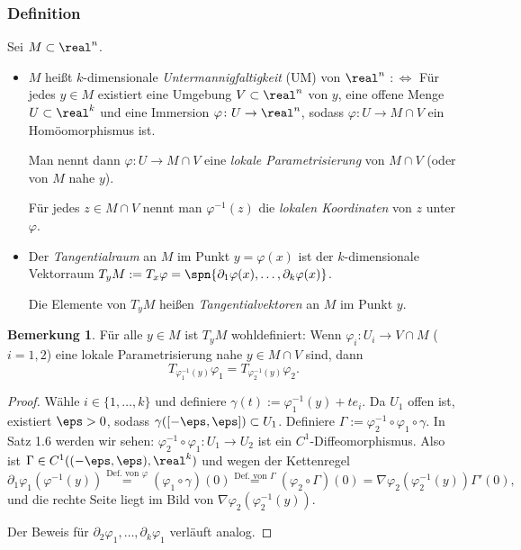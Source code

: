 \documentclass[
 a4paper,
 12pt,
 parskip=half
 ]{scrartcl}
\theoremstyle{plain}
\theoremstyle{definition}
\newtheorem*{rmrk}{Bemerkung}
\numberwithin{equation}{section}
\begin{document}
\subsubsection{Definition}
Sei $M \subset \real^n$.
\begin{itemize}
  \item $M$ heißt $k$-dimensionale \emph{Untermannigfaltigkeit} (UM) von $\real^n$ $:\Leftrightarrow$ Für jedes $y \in M$ existiert eine Umgebung $V \subset \real^n$ von $y$, eine offene Menge $U \subset \real^k$ und eine Immersion $\varphi\colon U \to \real^n$, sodass $\varphi\colon U \to M \cap V$ ein Homöomorphismus ist.
  
  Man nennt dann $\varphi\colon U \to M \cap V$ eine \emph{lokale Parametrisierung} von $M \cap V$ (oder von $M$ nahe $y$). 
  
  Für jedes $z \in M \cap V$ nennt man $\varphi^{-1}(z)$ die \emph{lokalen Koordinaten} von $z$ unter $\varphi$.
  \item Der \emph{Tangentialraum} an $M$ im Punkt $y = \varphi(x)$ ist der $k$-dimensionale Vektorraum $T_y M := T_x \varphi = \spn \{ \partial_1 \varphi(x), \ldots, \partial_k \varphi(x) \}$. 
  
  Die Elemente von $T_y M$ heißen \emph{Tangentialvektoren} an $M$ im Punkt $y$.
\end{itemize}

\begin{rmrk}
 Für alle $y \in M$ ist $T_y M$ wohldefiniert: Wenn $\varphi_i\colon U_i \to V \cap M$ ($i = 1,2$) eine lokale Parametrisierung nahe $y \in M \cap V$ sind, dann
 \[ T_{\varphi^{-1}_1(y)} \varphi_1 = T_{\varphi^{-1}_2(y)} \varphi_2. \]
\end{rmrk}

\begin{proof}
 Wähle $i \in \{1, \ldots, k\}$ und definiere $\gamma(t) := \varphi_1^{-1}(y) + t e_i$.
 Da $U_1$ offen ist, existiert $\eps > 0$, sodass $\gamma( [-\eps, \eps] ) \subset U_1$. Definiere $\Gamma := \varphi_2^{-1} \circ \varphi_1 \circ \gamma$. In Satz 1.6 werden wir sehen: $\varphi_2^{-1} \circ \varphi_1: U_1 \to U_2$ ist ein $C^1$-Diffeomorphismus. Also ist $\Gamma \in C^1( (-\eps,\eps), \real^k)$ und wegen der Kettenregel
 \[ \partial_1 \varphi_1 ( \varphi^{-1} (y) ) \overset{\text{Def. von } \varphi}{=} (\varphi_1 \circ \gamma) (0) \overset{\text{Def. von } \Gamma}{=} (\varphi_2 \circ \Gamma) (0) = \nabla \varphi_2( \varphi_2^{-1}(y) ) \Gamma'(0), \]
 und die rechte Seite liegt im Bild von $\nabla \varphi_2( \varphi_2^{-1}(y) )$.
 
 Der Beweis für $\partial_2 \varphi_1, \ldots, \partial_k \varphi_1$ verläuft analog.
\end{proof}
\end{document}
